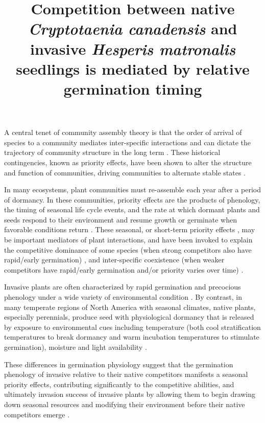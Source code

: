 \documentclass{article}\usepackage[]{graphicx}\usepackage[]{color}
\title{Competition between native \textit{Cryptotaenia canadensis} and invasive \textit{Hesperis matronalis} seedlings is mediated by relative germination timing}
\begin{document}
\maketitle
 A central tenet of community assembly theory is that the order of arrival of species to a community mediates inter-specific interactions and can dictate the trajectory of community structure in the long term \citep{Fukami2015}. These historical contingencies, known as priority effects, have been shown to alter the structure and function of communities, driving communities to alternate stable states \citep{Fukami2011}.

\noindent In many ecosystems, plant communities must re-assemble each year after a period of dormancy. In these communities, priority effects are the products of phenology, the timing of seasonal life cycle events, and the rate at which dormant plants and seeds respond to their environment and resume growth or germinate when favorable conditions return \citep{Rudolf:2019aa}.%
These seasonal, or short-term priority effects \citep{Wainwright_2011,Young:2017aa}, may be important mediators of plant interactions, and have been invoked to explain the competitive dominance of some species (when strong competitors also have rapid/early germination) \citep{Gioria2018}, and inter-specific coexistence (when weaker competitors have rapid/early germination and/or priority varies over time) \citep{Towers:2020aa}.

Invasive plants are often characterized by rapid germination and precocious phenology under a wide variety of environmental condition \citep{Gioria2018,Gioria:2017wo,Wolkovich:2011uh,Smith:2013uj}. By contrast, in many temperate regions of North America with seasonal climates, native plants, especially perennials,  produce seed with physiological dormancy that is released by exposure to environmental cues including temperature (both cool stratification temperatures to break dormancy and warm incubation temperatures to stimulate germination), moisture and light availability \citep{Bewley1997,Fenner2000}.

These differences in germination physiology suggest that the germination phenology of invasive relative to their native competitors manifests a seasonal priority effects, contributing  significantly to the competitive abilities, and ultimately invasion success of invasive plants by allowing them to begin drawing down seasonal resources and modifying their environment before their native competitors emerge \citep{Kardol2013}. 
\end{document}
